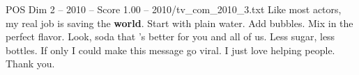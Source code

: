 \begin{textsample}{POS Dim 2 – 2010 – Score 1.00 – 2010/tv\_com\_2010\_3.txt}  \label{ex:f2_pos_045}
Like most actors, my real job is saving the \textbf{world}.
Start with plain water.
Add bubbles.
Mix in the perfect flavor.
Look, soda that 's better for you and all of us.
Less sugar, less bottles.
If only I could make this message go viral.
I just love helping people.
Thank you.

\end{textsample}
